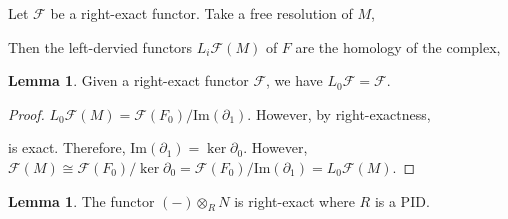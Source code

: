 \documentclass[12pt]{extarticle}
\renewcommand{\Im}[1]{\mathrm{Im}(#1)}
\theoremstyle{definition}
\newtheorem{lemma}[theorem]{Lemma}
\newenvironment{definition}[1][Definition:]{\begin{trivlist}
\item[\hskip \labelsep {\bfseries #1}]}{\end{trivlist}}
\begin{document}
\begin{definition}
Let $\mathcal{F}$ be a right-exact functor. Take a free resolution of $M$,
\begin{center}
\end{center}
Then the left-dervied functors $L_i\mathcal{F}(M)$ of $F$ are the homology of the complex,
\begin{center}
\end{center}
\end{definition}

\begin{lemma}
Given a right-exact functor $\mathcal{F}$, we have $L_0 \mathcal{F} = \mathcal{F}$.
\end{lemma}

\begin{proof}
$L_0 \mathcal{F}(M) = \mathcal{F}(F_0) / \Im{\partial_1}$. However, 
by right-exactness,
\begin{center}
\end{center}
is exact. Therefore, $\Im{\partial_1} = \ker{\partial_0}$. However, $\mathcal{F}(M) \cong \mathcal{F}(F_0)/ \ker{\partial_0} = \mathcal{F}(F_0)/\Im{\partial_1} = L_0 \mathcal{F}(M)$. 
\end{proof}

\begin{lemma}
The functor $(-) \otimes_R N$ is right-exact where $R$ is a PID.
\end{lemma}
\end{document}
